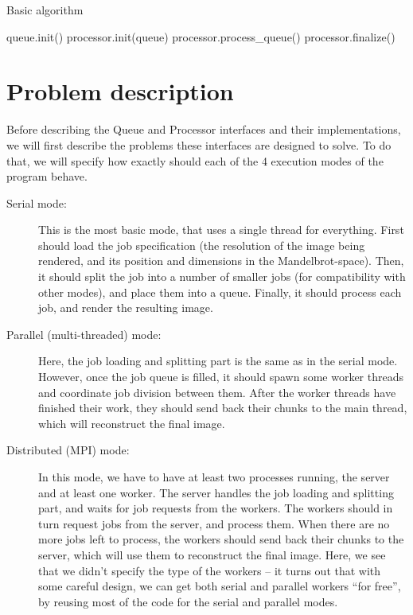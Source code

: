\documentclass[a4paper]{article}
\begin{document}
	\begin{algorithm}
		\caption{Basic algorithm} \label{alg:basic algorithm}
		\begin{algorithmic}[1]
				\State queue.init()
				\State processor.init(queue)
				\State processor.process\_queue()
				\State processor.finalize()
			\EndProcedure
		\end{algorithmic}
	\end{algorithm}	
	
	\section{Problem description}
	Before describing the Queue and Processor interfaces and their implementations, we will first describe the problems these interfaces are designed to solve. To do that, we will specify how exactly should each of the 4 execution modes of the program behave.
	
	\begin{description}
		\item[Serial mode:] This is the most basic mode, that uses a single thread for everything. First should load the job specification (the resolution of the image being rendered, and its position and dimensions in the Mandelbrot-space). Then, it should split the job into a number of smaller jobs (for compatibility with other modes), and place them into a queue. Finally, it should process each job, and render the resulting image.
		\item[Parallel (multi-threaded) mode:] Here, the job loading and splitting part is the same as in the serial mode. However, once the job queue is filled, it should spawn some worker threads and coordinate job division between them. After the worker threads have finished their work, they should send back their chunks to the main thread, which will reconstruct the final image.
		\item[Distributed (MPI) mode:] In this mode, we have to have at least two processes running, the server and at least one worker. The server handles the job loading and splitting part, and waits for job requests from the workers. The workers should in turn request jobs from the server, and process them. When there are no more jobs left to process, the workers should send back their chunks to the server, which will use them to reconstruct the final image. Here, we see that we didn't specify the type of the workers -- it turns out that with some careful design, we can get both serial and parallel workers ``for free'', by reusing most of the code for the serial and parallel modes.
	\end{description}
	
\end{document}
